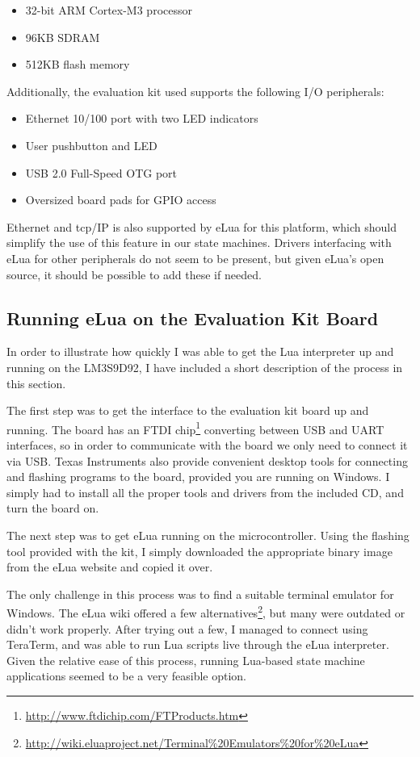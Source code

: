 \begin{itemize}
	\item 32-bit ARM Cortex-M3 processor
	\item 96KB SDRAM
	\item 512KB flash memory
\end{itemize}

Additionally, the evaluation kit used supports the following I/O peripherals:

\begin{itemize}
	\item Ethernet 10/100 port with two LED indicators
	\item User pushbutton and LED
	\item USB 2.0 Full-Speed OTG port
	\item Oversized board pads for GPIO access
\end{itemize}

Ethernet and \gls{tcp}/IP is also supported by eLua for this platform, which should simplify the use of this feature in our state machines. Drivers interfacing with eLua for other peripherals do not seem to be present, but given eLua's open source, it should be possible to add these if needed.

\subsection{Running eLua on the Evaluation Kit Board}
\label{sec:running_elua}
In order to illustrate how quickly I was able to get the Lua interpreter up and running on the LM3S9D92, I have included a short description of the process in this section.

The first step was to get the interface to the evaluation kit board up and running. The board has an FTDI chip\footnote{\url{http://www.ftdichip.com/FTProducts.htm}} converting between USB and UART interfaces, so in order to communicate with the board we only need to connect it via USB. Texas Instruments also provide convenient desktop tools for connecting and flashing programs to the board, provided you are running on Windows. I simply had to install all the proper tools and drivers from the included CD, and turn the board on.

The next step was to get eLua running on the microcontroller. Using the flashing tool provided with the kit, I simply downloaded the appropriate binary image from the eLua website and copied it over.

The only challenge in this process was to find a suitable terminal emulator for Windows. The eLua wiki offered a few alternatives\footnote{\url{http://wiki.eluaproject.net/Terminal\%20Emulators\%20for\%20eLua}}, but many were outdated or didn't work properly. After trying out a few, I managed to connect using TeraTerm, and was able to run Lua scripts live through the eLua interpreter. Given the relative ease of this process, running Lua-based state machine applications seemed to be a very feasible option.

